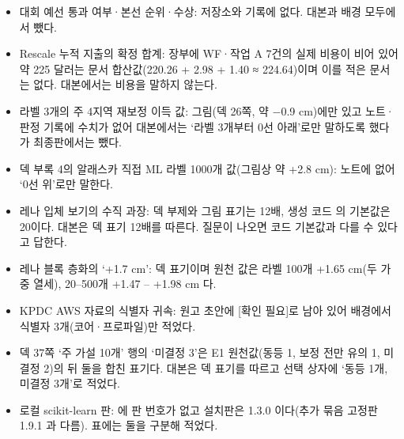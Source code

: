 \begin{itemize}[leftmargin=1.4em, itemsep=0.15em]
  \item 대회 예선 통과 여부·본선 순위·수상: 저장소와 기록에 없다. 대본과 배경 모두에서 뺐다.
  \item Rescale 누적 지출의 확정 합계: 장부에 WF·작업 A 7건의 실제 비용이 비어 있어 약 225 달러는 문서 합산값(220.26 + 2.98 + 1.40 ≈ 224.64)이며 이를 적은 문서는 없다. 대본에서는 비용을 말하지 않는다.
  \item 라벨 3개의 주 4지역 재보정 이득 값: 그림(덱 26쪽, 약 −0.9 cm)에만 있고 노트·판정 기록에 수치가 없어 대본에서는 ‘라벨 3개부터 0선 아래’로만 말하도록 했다가 최종판에서는 뺐다.
  \item 덱 부록 4의 알래스카 직접 ML 라벨 1000개 값(그림상 약 +2.8 cm): 노트에 없어 ‘0선 위’로만 말한다.
  \item 레나 입체 보기의 수직 과장: 덱 부제와 그림 표기는 12배, 생성 코드  의 기본값은 20이다. 대본은 덱 표기 12배를 따른다. 질문이 나오면 코드 기본값과 다를 수 있다고 답한다.
  \item 레나 블록 층화의 ‘+1.7 cm’: 덱 표기이며 원천 값은 라벨 100개 +1.65 cm(두 가중 열세), 20–500개 +1.47 – +1.98 cm 다.
  \item KPDC AWS 자료의 식별자 귀속: 원고 초안에 [확인 필요]로 남아 있어 배경에서 식별자 3개(코어·프로파일)만 적었다.
  \item 덱 37쪽 ‘주 가설 10개’ 행의 ‘미결정 3’은 E1 원천값(동등 1, 보정 전만 유의 1, 미결정 2)의 뒤 둘을 합친 표기다. 대본은 덱 표기를 따르고 선택 상자에 ‘동등 1개, 미결정 3개’로 적었다.
  \item 로컬 scikit-learn 판:  에 판 번호가 없고 설치판은 1.3.0 이다(추가 묶음 고정판 1.9.1 과 다름). 표에는 둘을 구분해 적었다.
\end{itemize}
